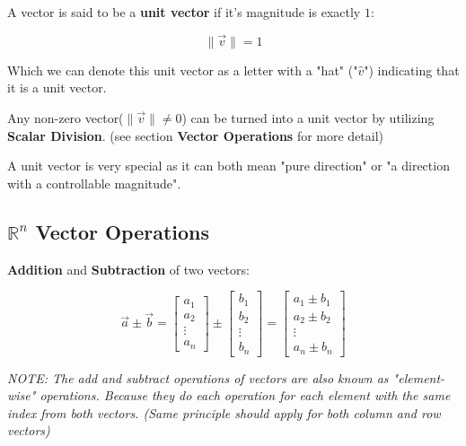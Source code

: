 \begin{samepage}
        A vector is said to be a \textbf{unit vector} if it's magnitude is exactly $1$:
        \begin{center}
            \[
                \|\vec{v}\|=1
            \]
        \end{center}

        Which we can denote this unit vector as a letter with a "hat" ("$\hat{v}$") indicating that it is a unit vector.

        Any non-zero vector($\|\vec{v}\| \neq 0$) can be turned into a unit vector by utilizing \textbf{Scalar Division}. (see section \textbf{Vector Operations} for more detail)

        A unit vector is very special as it can both mean "pure direction" or "a direction with a controllable magnitude".
\end{samepage}

\sgap



\subsection{$\mathbb{R}^n$ Vector Operations}

\textbf{Addition} and \textbf{Subtraction} of two vectors:
\begin{center}
    \[
        {\vec{a}}\pm{\vec{b}}=\begin{bmatrix}a_1 \\ a_2 \\ \vdots \\ a_n\end{bmatrix} \pm \begin{bmatrix}b_1 \\ b_2 \\ \vdots \\ b_n\end{bmatrix}=\begin{bmatrix}a_1 \pm b_1 \\ a_2 \pm b_2 \\ \vdots \\ a_n \pm b_n\end{bmatrix}
    \]
\end{center}

\vspace{.5em}

\emph{
    NOTE: The add and subtract operations of vectors are also known as "element-wise" operations.
Because they do each operation for each element with the same index from both vectors.
(Same principle should apply for both column and row vectors)
}

